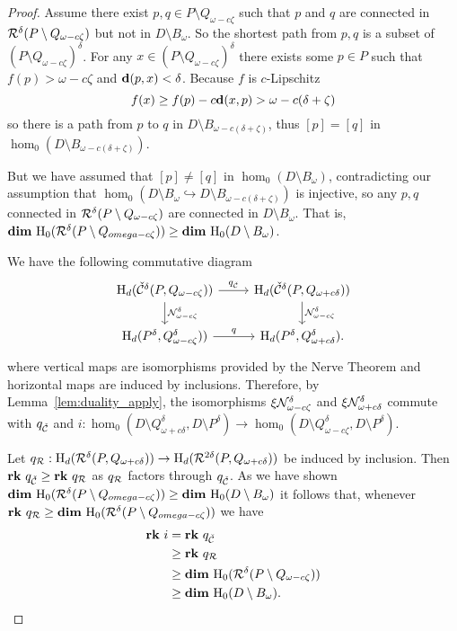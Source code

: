 \begin{proof}
  Assume there exist $p,q \in P\setminus Q_{\omega-c\zeta}$ such that $p$ and $q$ are connected in $\mathcal{R}^\delta(P\setminus Q_{\omega-c\zeta})$ but not in $D\setminus B_\omega$.
  So the shortest path from $p, q$ is a subset of $(P\setminus Q_{\omega-c\zeta})^\delta$.
  For any $x\in (P\setminus Q_{\omega-c\zeta})^\delta$ there exists some $p\in P$ such that $f(p) > \omega - c\zeta$ and $\mathbf{d}(p,x) < \delta$.
  Because $f$ is $c$-Lipschitz
  \[ f(x)\geq f(p) - c\mathbf{d}(x,p) > \omega - c(\delta+\zeta)\]
  so there is a path from $p$ to $q$ in $D\setminus B_{\omega-c(\delta+\zeta)}$, thus $[p] = [q]$ in $\hom_0(D\setminus B_{\omega-c(\delta+\zeta)})$.

  But we have assumed that $[p]\neq[q]$ in $\hom_0(D\setminus B_\omega)$, contradicting our assumption that $\hom_0(D\setminus B_\omega\hookrightarrow D\setminus B_{\omega-c(\delta+\zeta)})$ is injective, so any $p,q$ connected in $\mathcal{R}^\delta(P\setminus Q_{\omega-c\zeta})$ are connected in $D\setminus B_\omega$.
  That is, $\mathbf{dim}~\mathrm{H}_0(\mathcal{R}^\delta(P\setminus Q_{omega-c\zeta}))\geq \mathbf{dim}~\mathrm{H}_0(D\setminus B_\omega)$.

  We have the following commutative diagram
  \[\begin{tikzcd}
    \hom_d(\cech^\delta(P, Q_{\omega-c\zeta})) \arrow{r}{q_{\cech}}\arrow{d}{\N_{\omega-c\zeta}^{\delta}} &
    \hom_d(\cech^\delta(P, Q_{\omega+c\delta})) \arrow{d}{\N_{\omega-c\zeta}^\delta}\\
    \hom_d(P^\delta, Q_{\omega-c\zeta}^\delta))\arrow{r}{q} &
    \hom_d(P^\delta, Q_{\omega+c\delta}^\delta).
  \end{tikzcd}\]
  where vertical maps are isomorphisms provided by the Nerve Theorem and horizontal maps are induced by inclusions.
  Therefore, by Lemma~\ref{lem:duality_apply}, the isomorphisms $\xi\mathcal{N}_{\omega-c\zeta}^\delta$ and $\xi\mathcal{N}_{\omega+c\delta}^\delta$ commute with $q_{\check{\mathcal{C}}}$ and $i : \hom_0(D\setminus Q_{\omega+c\delta}^\delta, D\setminus P^\delta)\to \hom_0(D\setminus Q_{\omega-c\zeta}^\delta, D\setminus P^\delta)$.

  Let $q_{\mathcal{R}} : \mathrm{H}_d(\mathcal{R}^{\delta}(P, Q_{\omega+c\delta}))\to\mathrm{H}_d(\mathcal{R}^{2\delta}(P, Q_{\omega+c\delta}))$ be induced by inclusion.
  Then $\mathbf{rk}~q_{\check{\mathcal{C}}} \geq\mathbf{rk}~q_{\mathcal{R}}$ as $q_{\mathcal{R}}$ factors through $q_{\check{\mathcal{C}}}$.
  As we have shown $\mathbf{dim}~\mathrm{H}_0(\mathcal{R}^\delta(P\setminus Q_{omega-c\zeta}))\geq \mathbf{dim}~\mathrm{H}_0(D\setminus B_\omega)$ it follows that, whenever $\mathbf{rk}~q_{\mathcal{R}} \geq \mathbf{dim}~\mathrm{H}_0(\mathcal{R}^\delta(P\setminus Q_{omega-c\zeta}))$ we have
  \begin{align*}
    \mathbf{rk}~i &= \mathbf{rk}~q_{\check{\mathcal{C}}}\\
      &\geq \mathbf{rk}~q_{\mathcal{R}}\\
      &\geq \mathbf{dim}~\mathrm{H}_0(\mathcal{R}^\delta(P\setminus Q_{\omega-c\zeta}))\\
      &\geq \mathbf{dim}~\mathrm{H}_0(D\setminus B_\omega).
  \end{align*}


\end{proof}
